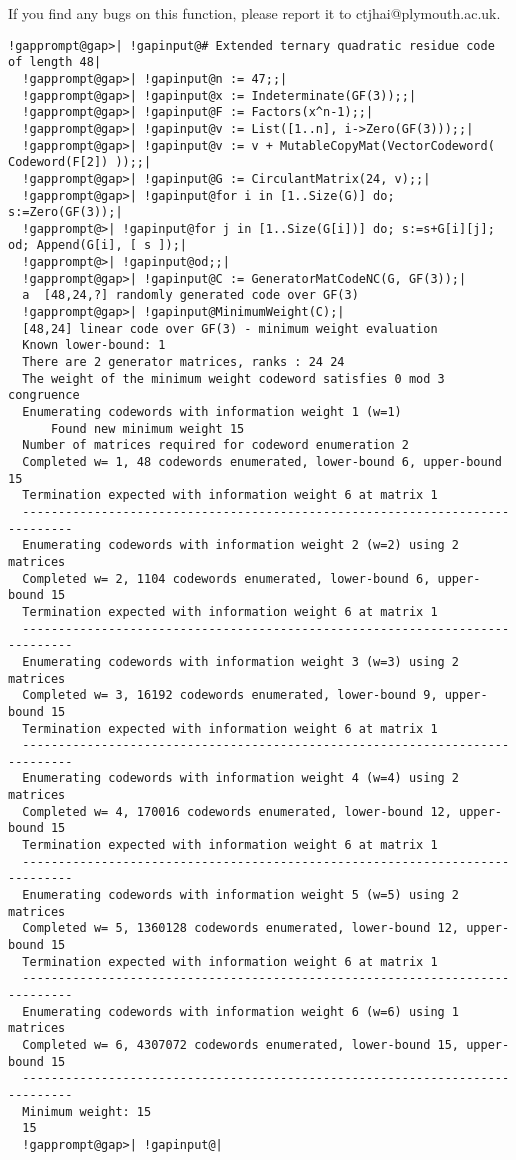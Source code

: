 \documentclass[a4paper,11pt]{report}
\begin{document}
{{{ If you find any bugs on this function, please report it to
ctjhai@plymouth.ac.uk. }

 
\begin{Verbatim}[commandchars=!@|,fontsize=\small,frame=single,label=Example]
  !gapprompt@gap>| !gapinput@# Extended ternary quadratic residue code of length 48|
  !gapprompt@gap>| !gapinput@n := 47;;|
  !gapprompt@gap>| !gapinput@x := Indeterminate(GF(3));;|
  !gapprompt@gap>| !gapinput@F := Factors(x^n-1);;|
  !gapprompt@gap>| !gapinput@v := List([1..n], i->Zero(GF(3)));;|
  !gapprompt@gap>| !gapinput@v := v + MutableCopyMat(VectorCodeword( Codeword(F[2]) ));;|
  !gapprompt@gap>| !gapinput@G := CirculantMatrix(24, v);;|
  !gapprompt@gap>| !gapinput@for i in [1..Size(G)] do; s:=Zero(GF(3));|
  !gapprompt@>| !gapinput@for j in [1..Size(G[i])] do; s:=s+G[i][j]; od; Append(G[i], [ s ]);|
  !gapprompt@>| !gapinput@od;;|
  !gapprompt@gap>| !gapinput@C := GeneratorMatCodeNC(G, GF(3));|
  a  [48,24,?] randomly generated code over GF(3)
  !gapprompt@gap>| !gapinput@MinimumWeight(C);|
  [48,24] linear code over GF(3) - minimum weight evaluation
  Known lower-bound: 1
  There are 2 generator matrices, ranks : 24 24 
  The weight of the minimum weight codeword satisfies 0 mod 3 congruence
  Enumerating codewords with information weight 1 (w=1)
      Found new minimum weight 15
  Number of matrices required for codeword enumeration 2
  Completed w= 1, 48 codewords enumerated, lower-bound 6, upper-bound 15
  Termination expected with information weight 6 at matrix 1
  -----------------------------------------------------------------------------
  Enumerating codewords with information weight 2 (w=2) using 2 matrices
  Completed w= 2, 1104 codewords enumerated, lower-bound 6, upper-bound 15
  Termination expected with information weight 6 at matrix 1
  -----------------------------------------------------------------------------
  Enumerating codewords with information weight 3 (w=3) using 2 matrices
  Completed w= 3, 16192 codewords enumerated, lower-bound 9, upper-bound 15
  Termination expected with information weight 6 at matrix 1
  -----------------------------------------------------------------------------
  Enumerating codewords with information weight 4 (w=4) using 2 matrices
  Completed w= 4, 170016 codewords enumerated, lower-bound 12, upper-bound 15
  Termination expected with information weight 6 at matrix 1
  -----------------------------------------------------------------------------
  Enumerating codewords with information weight 5 (w=5) using 2 matrices
  Completed w= 5, 1360128 codewords enumerated, lower-bound 12, upper-bound 15
  Termination expected with information weight 6 at matrix 1
  -----------------------------------------------------------------------------
  Enumerating codewords with information weight 6 (w=6) using 1 matrices
  Completed w= 6, 4307072 codewords enumerated, lower-bound 15, upper-bound 15
  -----------------------------------------------------------------------------
  Minimum weight: 15
  15
  !gapprompt@gap>| !gapinput@|
  

\end{Verbatim}}}
\end{document}
